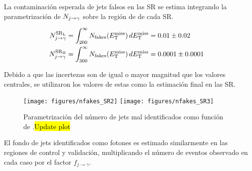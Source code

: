 La contaminación esperada de jets falsos en las SR se estima integrando la
parametrización de $N_{j\rightarrow\gamma}$ sobre la región de {\met} de cada SR.

\begin{align}
  N_{j\rightarrow\gamma}^\text{\ensuremath{\mathrm{SR}_\mathrm{L}}} &= \int_{200}^{\infty} N_\text{fakes}(E_{\mathrm{T}}^{\mathrm{miss}}) \, dE_{\mathrm{T}}^{\mathrm{miss}} = 0.01 \pm 0.02 \\
  N_{j\rightarrow\gamma}^\text{\ensuremath{\mathrm{SR}_\mathrm{H}}} &= \int_{300}^{\infty} N_\text{fakes}(E_{\mathrm{T}}^{\mathrm{miss}}) \, dE_{\mathrm{T}}^{\mathrm{miss}} = 0.0001 \pm 0.0001
\end{align}

Debido a que las incertezas son de igual o mayor magnitud que los valores centrales,
se utilizaron los valores de estas como la estimación final en las SR.


\begin{figure}[!htbp]
  \centering
  \texttt{[image: figures/nfakes\_SR2]}  \hfill
  \texttt{[image: figures/nfakes\_SR3]}
  \caption{Parametrización del número de jets mal identificados como
    función de {\met}.\hl{Update plot}}
  \label{fig:jetfake_nfakes_met}
\end{figure}

El fondo de jets identificados como fotones es estimado similarmente en las
regiones de control y validación,
multiplicando el número de eventos observado en cada caso por el factor
$f_{j\to\gamma}$.









